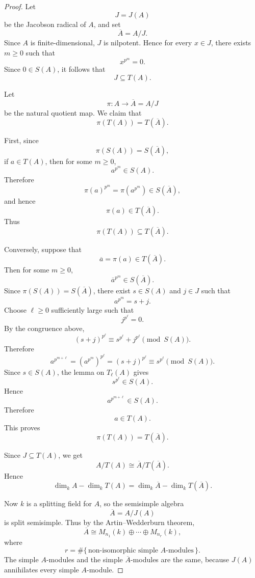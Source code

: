 \begin{proof}
    Let
    \[
        J=J(A)
    \]
    be the Jacobson radical of \(A\), and set
    \[
        \overline{A}=A/J.
    \]
    Since \(A\) is finite-dimensional, \(J\) is nilpotent. Hence for every
    \(x\in J\), there exists \(m\geq 0\) such that
    \[
        x^{p^m}=0.
    \]
    Since \(0\in S(A)\), it follows that
    \[
        J\subseteq T(A).
    \]

    Let
    \[
        \pi:A\longrightarrow \overline{A}=A/J
    \]
    be the natural quotient map. We claim that
    \[
        \pi(T(A))=T(\overline{A}).
    \]

    First, since
    \[
        \pi(S(A))=S(\overline{A}),
    \]
    if \(a\in T(A)\), then for some \(m\geq 0\),
    \[
        a^{p^m}\in S(A).
    \]
    Therefore
    \[
        \pi(a)^{p^m}
        =
        \pi(a^{p^m})
        \in S(\overline{A}),
    \]
    and hence
    \[
        \pi(a)\in T(\overline{A}).
    \]
    Thus
    \[
        \pi(T(A))\subseteq T(\overline{A}).
    \]

    Conversely, suppose that
    \[
        \overline{a}=\pi(a)\in T(\overline{A}).
    \]
    Then for some \(m\geq 0\),
    \[
        \overline{a}^{p^m}\in S(\overline{A}).
    \]
    Since \(\pi(S(A))=S(\overline{A})\), there exist \(s\in S(A)\) and \(j\in J\) such that
    \[
        a^{p^m}=s+j.
    \]
    Choose \(\ell\geq 0\) sufficiently large such that
    \[
        j^{p^\ell}=0.
    \]
    By the congruence above,
    \[
        (s+j)^{p^\ell}
        \equiv
        s^{p^\ell}+j^{p^\ell}
        \pmod{S(A)}.
    \]
    Therefore
    \[
        a^{p^{m+\ell}}
        =
        (a^{p^m})^{p^\ell}
        =
        (s+j)^{p^\ell}
        \equiv
        s^{p^\ell}
        \pmod{S(A)}.
    \]
    Since \(s\in S(A)\), the lemma on \(T_\ell(A)\) gives
    \[
        s^{p^\ell}\in S(A).
    \]
    Hence
    \[
        a^{p^{m+\ell}}\in S(A).
    \]
    Therefore
    \[
        a\in T(A).
    \]
    This proves
    \[
        \pi(T(A))=T(\overline{A}).
    \]

    Since \(J\subseteq T(A)\), we get
    \[
        A/T(A)\cong \overline{A}/T(\overline{A}).
    \]
    Hence
    \[
        \dim_k A-\dim_k T(A)
        =
        \dim_k \overline{A}-\dim_k T(\overline{A}).
    \]

    Now \(k\) is a splitting field for \(A\), so the semisimple algebra
    \[
        \overline{A}=A/J(A)
    \]
    is split semisimple. Thus by the Artin--Wedderburn theorem,
    \[
        \overline{A}
        \cong
        M_{n_1}(k)\oplus\cdots\oplus M_{n_r}(k),
    \]
    where
    \[
        r=
        \#\{\,\text{non-isomorphic simple }A\text{-modules}\,\}.
    \]
    The simple \(A\)-modules and the simple \(\overline{A}\)-modules are the same,
    because \(J(A)\) annihilates every simple \(A\)-module.


\end{proof}
